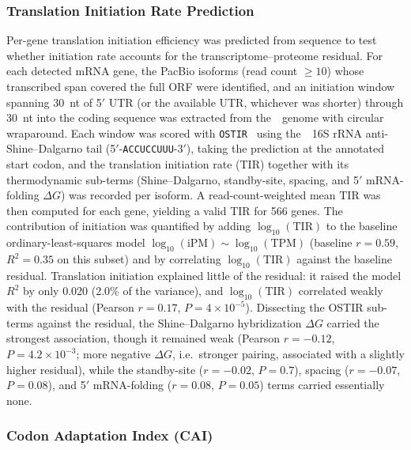 \subsubsection{Translation Initiation Rate Prediction}
\label{method:corr-TIR}
Per-gene translation initiation efficiency was predicted from sequence to test whether initiation rate accounts for the transcriptome--proteome residual.
For each detected mRNA gene, the PacBio isoforms (read count $\geq 10$) whose transcribed span covered the full ORF were identified, and an initiation window spanning 30~nt of 5$'$ UTR (or the available UTR, whichever was shorter) through 30~nt into the coding sequence was extracted from the~\syn~genome with circular wraparound.
Each window was scored with \texttt{OSTIR}~\cite{roots_ostir_2021} using the~\syn~16S rRNA anti-Shine--Dalgarno tail (5$'$-\texttt{ACCUCCUUU}-3$'$), taking the prediction at the annotated start codon, and the translation initiation rate (TIR) together with its thermodynamic sub-terms (Shine--Dalgarno, standby-site, spacing, and 5$'$ mRNA-folding $\Delta G$) was recorded per isoform.
A read-count-weighted mean TIR was then computed for each gene, yielding a valid TIR for 566 genes.
The contribution of initiation was quantified by adding $\log_{10}(\text{TIR})$ to the baseline ordinary-least-squares model $\log_{10}(\text{iPM}) \sim \log_{10}(\text{TPM})$ (baseline $r = 0.59$, $R^{2} = 0.35$ on this subset) and by correlating $\log_{10}(\text{TIR})$ against the baseline residual.
Translation initiation explained little of the residual: it raised the model $R^{2}$ by only 0.020 (2.0\% of the variance), and $\log_{10}(\text{TIR})$ correlated weakly with the residual (Pearson $r = 0.17$, $P = 4 \times 10^{-5}$).
Dissecting the OSTIR sub-terms against the residual, the Shine--Dalgarno hybridization $\Delta G$ carried the strongest association, though it remained weak (Pearson $r = -0.12$, $P = 4.2 \times 10^{-3}$; more negative $\Delta G$, i.e.\ stronger pairing, associated with a slightly higher residual), while the standby-site ($r = -0.02$, $P = 0.7$), spacing ($r = -0.07$, $P = 0.08$), and 5$'$ mRNA-folding ($r = 0.08$, $P = 0.05$) terms carried essentially none.


\subsubsection{Codon Adaptation Index (CAI)}

